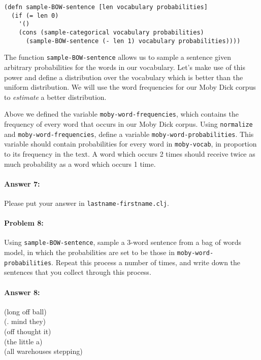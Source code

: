 \documentclass[10pt]{article}
\begin{document}
\begin{lstlisting}
(defn sample-BOW-sentence [len vocabulary probabilities]
  (if (= len 0)
    '()
    (cons (sample-categorical vocabulary probabilities)
	  (sample-BOW-sentence (- len 1) vocabulary probabilities))))
\end{lstlisting}

The function \texttt{sample-BOW-sentence} allows us to sample a
sentence given arbitrary probabilities for the words in our
vocabulary. Let's make use of this power and define a distribution
over the vocabulary which is better than the uniform distribution. We
will use the word frequencies for our Moby Dick corpus to
\emph{estimate} a better distribution.
  
Above we defined the variable \texttt{moby-word-frequencies}, which
contains the frequency of every word that occurs in our Moby Dick
corpus. Using \texttt{normalize} and \texttt{moby-word-frequencies},
define a variable \texttt{moby-word-probabilities}. This variable
should contain probabilities for every word in \texttt{moby-vocab}, in
proportion to its frequency in the text. A word which occurs 2 times
should receive twice as much probability as a word which occurs 1
time.

\paragraph{Answer 7:} Please put your answer in
\texttt{lastname-firstname.clj}.

\hrulefill
\paragraph{Problem 8:}

Using \texttt{sample-BOW-sentence}, sample a 3-word sentence from a
bag of words model, in which the probabilities are set to be those in
\texttt{moby-word-probabilities}. Repeat this process a number of
times, and write down the sentences that you collect through this
process.

\paragraph{Answer 8:} 
(long off ball) \\
(. mind they) \\
(off thought it) \\
(the little a) \\
(all warehouses stepping)
\end{document}
